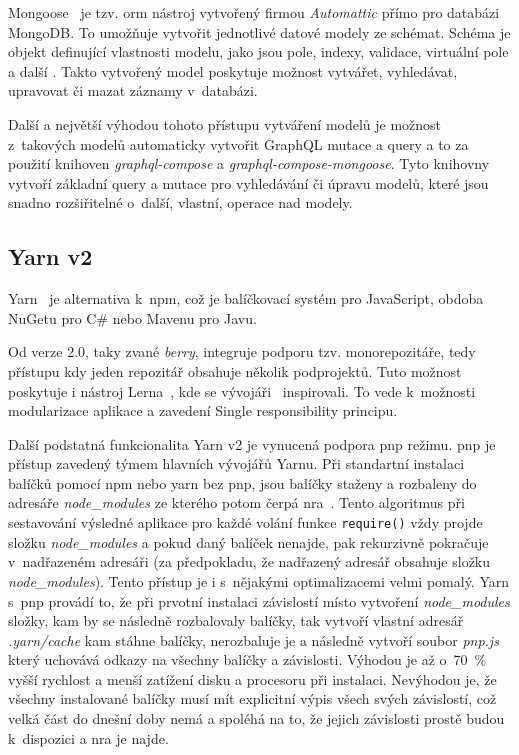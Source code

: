 Mongoose~\cite{automatticinc_2011_mongoose} je tzv. \acrfull{orm} nástroj vytvořený firmou \emph{Automattic} přímo pro databázi MongoDB. To umožňuje vytvořit jednotlivé datové modely ze schémat. Schéma je objekt definující vlastnosti modelu, jako jsou pole, indexy, validace, virtuální pole a další \cite{automatticinc_2020_mongoose}. Takto vytvořený model poskytuje možnost vytvářet, vyhledávat, upravovat či mazat záznamy v~databázi.

Další a největší výhodou tohoto přístupu vytváření modelů je možnost z~takových modelů automaticky vytvořit GraphQL mutace a query a to za použití knihoven \emph{graphql-compose} a \emph{graphql-compose-mongoose}. Tyto knihovny vytvoří základní query a mutace pro vyhledávání či úpravu modelů, které jsou snadno rozšiřitelné o~další, vlastní, operace nad modely.

\subsection{Yarn v2}
\label{ss:yarn}
Yarn~\cite{facebookinc_2019_yarn} je alternativa k~\acrshort{npm}, což je balíčkovací systém pro JavaScript, obdoba NuGetu pro C\# nebo Mavenu pro Javu.

Od verze 2.0, taky zvané \emph{berry}, integruje podporu tzv. monorepozitáře, tedy přístupu kdy jeden repozitář obsahuje několik podprojektů. Tuto možnost poskytuje i nástroj Lerna~\cite{lernacontributors_2015_lerna}, kde se vývojáři~ inspirovali. To vede k~možnosti modularizace aplikace a zavedení Single responsibility principu.

Další podstatná funkcionalita Yarn v2 je vynucená podpora \acrfull{pnp} režimu. \acrshort{pnp} je přístup zavedený týmem hlavních vývojářů Yarnu. Při standartní instalaci balíčků pomocí npm nebo yarn bez pnp, jsou balíčky staženy a rozbaleny do adresáře \emph{node\_modules} ze kterého potom čerpá \acrfull{nra}~\cite{joyentinc_1_noderesolutionalgorithm}. Tento algoritmus při sestavování výsledné aplikace pro každé volání funkce \texttt{require()} vždy projde složku \emph{node\_modules} a pokud daný balíček nenajde, pak rekurzivně pokračuje v~nadřazeném adresáři (za předpokladu, že nadřazený adresář obsahuje složku \emph{node\_modules}). Tento přístup je i s~nějakými optimalizacemi velmi pomalý. Yarn s~\acrshort{pnp} provádí to, že při prvotní instalaci závislostí místo vytvoření \emph{node\_modules} složky, kam by se následně rozbalovaly balíčky, tak vytvoří vlastní adresář \emph{.yarn/cache} kam stáhne balíčky, nerozbaluje je a následně vytvoří soubor \emph{pnp.js} který uchovává odkazy na všechny balíčky a závislosti. Výhodou je až o~70~\% vyšší rychlost a menší zatížení disku a procesoru při instalaci. Nevýhodou je, že všechny instalované balíčky musí mít explicitní výpis všech svých závislostí, což velká část do dnešní doby nemá a spoléhá na to, že jejich závislosti prostě budou k~dispozici a \acrshort{nra} je najde.

